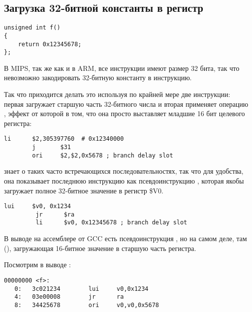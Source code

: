 ﻿\subsection{Загрузка 32-битной константы в регистр}
\label{MIPS_big_constants}

\begin{lstlisting}[style=customc]
unsigned int f()
{
	return 0x12345678;
};
\end{lstlisting}

В MIPS, так же как и в ARM, все инструкции имеют размер 32 бита, так что невозможно
закодировать 32-битную константу в инструкцию.

Так что приходится делать это используя по крайней мере две инструкции:
первая загружает старшую часть 32-битного числа и вторая применяет операцию ,
эффект от которой в том, что она просто выставляет младшие 16 бит целевого регистра:

\begin{lstlisting}[caption=GCC 4.4.5 -O3 (\assemblyOutput),style=customasmMIPS]
        li      $2,305397760  # 0x12340000
        j       $31
        ori     $2,$2,0x5678 ; branch delay slot
\end{lstlisting}

\IDA знает о таких часто встречающихся последовательностях, так что для удобства, 
она показывает последнюю инструкцию  как псевдоинструкцию ,
которая якобы загружает полное 32-битное значение в регистр \$V0.


\begin{lstlisting}[caption=GCC 4.4.5 -O3 (IDA),style=customasmMIPS]
         lui     $v0, 0x1234
         jr      $ra
         li      $v0, 0x12345678 ; branch delay slot
\end{lstlisting}

В выводе на ассемблере от GCC есть псевдоинструкция , но на самом деле, 
там  (), загружающая 16-битное значение в старшую часть регистра.

Посмотрим в выводе :

\begin{lstlisting}[caption=objdump,style=customasmMIPS]
00000000 <f>:
   0:   3c021234        lui     v0,0x1234
   4:   03e00008        jr      ra
   8:   34425678        ori     v0,v0,0x5678
\end{lstlisting}

